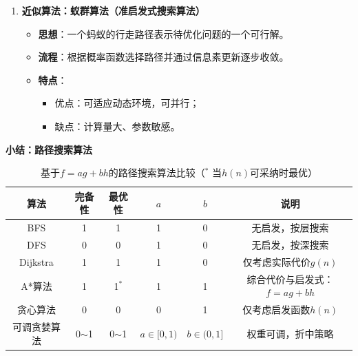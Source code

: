 \documentclass[../main.tex]{subfiles}
\begin{document}
\begin{enumerate}
    \item \textbf{近似算法：蚁群算法（准启发式搜索算法）}\label{subsubsec:Ant}
        \begin{itemize}
            \item \textbf{思想}：一个蚂蚁的行走路径表示待优化问题的一个可行解。
            \item \textbf{流程}：根据概率函数选择路径并通过信息素更新逐步收敛。
            \item \textbf{特点}：
                \begin{itemize}
                    \item 优点：可适应动态环境，可并行；
                    \item 缺点：计算量大、参数敏感。
                \end{itemize}
        \end{itemize}
\end{enumerate}

\textbf{小结：路径搜索算法}
\begin{table}[H]
    \centering
    \small
    \begin{tabular}{cccccc}
        \toprule
        \textbf{算法} & \textbf{完备性} & \textbf{最优性} & \textbf{$a$} & \textbf{$b$} & \textbf{说明}\\
        \midrule
        BFS & 1 & 1 & 1 & 0 & 无启发，按层搜索\\
        DFS & 0 & 0 & 1 & 0 & 无启发，按深搜索\\
        Dijkstra & 1 & 1 & 1 & 0 & 仅考虑实际代价$g(n)$\\
        A*算法 & 1 & 1$^\ast$ & 1 & 1 & 综合代价与启发式：$f=ag+bh$\\
        贪心算法 & 0 & 0 & 0 & 1 & 仅考虑启发函数$h(n)$\\
        可调贪婪算法 & 0$\sim$1 & 0$\sim$1 & $a\in[0,1)$ & $b\in(0,1]$ & 权重可调，折中策略\\
        \bottomrule
    \end{tabular}
        \caption{基于$f = a g + b h$的路径搜索算法比较（$^\ast$ 当$h(n)$可采纳时最优）}
    \label{tab:astar_compare_cn}
\end{table}
\end{document}
